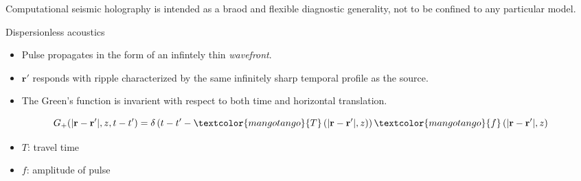 \documentclass{beamer}
\begin{document}
\begin{frame}
    \Large\textcolor{lemon}{Computational seismic holography is
    intended as a braod and flexible diagnostic generality, not to be
    confined to any particular model.}
\end{frame}

\begin{frame}{Dispersionless acoustics}
    \begin{itemize}
        \item Pulse propagates in the form of an infintely thin \emph{wavefront}.
        \item $\mathbf{r}'$ responds with ripple characterized
            by the same infinitely sharp temporal profile as the
            source.
        \item The Green's function is invarient with
            respect to both time and horizontal translation.
    \end{itemize}
    $$ G_{+}(|\mathbf{r}-\mathbf{r}'|,z,t-t') =
    \delta\left(
    t-t'-\textcolor{mangotango}{T}\left(|\mathbf{r}-\mathbf{r}'|,z\right)\right)
       \textcolor{mangotango}{f}\left(|\mathbf{r}-\mathbf{r}'|,z\right)$$
       \begin{itemize}
           \item $T$: travel time
           \item $f$: amplitude of pulse
       \end{itemize}
\end{frame}

\end{document}
